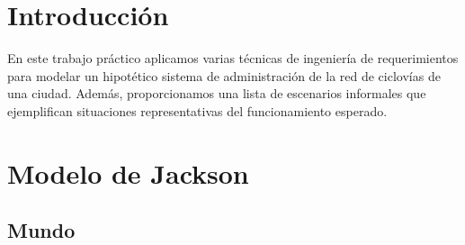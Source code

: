 \documentclass[a4paper, 10pt, twoside]{article}
\begin{document}
\newpage




\tableofcontents

\newpage




\section{Introducción}

En este trabajo práctico aplicamos varias técnicas de ingeniería de requerimientos para modelar un hipotético sistema de administración de la red de ciclovías de una ciudad. Además, proporcionamos una lista de escenarios informales que ejemplifican situaciones representativas del funcionamiento esperado.




\section{Modelo de Jackson}


\subsection{Mundo}
\end{document}
